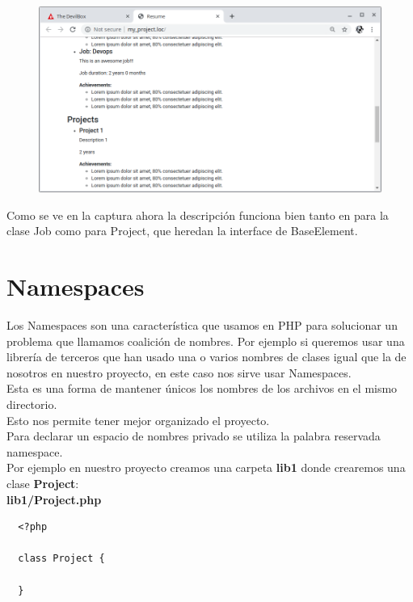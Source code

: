 \documentclass{article}
\begin{document}
\begin{figure}[h!]
  \centering
  \includegraphics[scale=0.5]{./Pictures/049_herencia_interface.png}
\end{figure}

Como se ve en la captura ahora la descripción funciona bien tanto en para la
clase Job como para Project, que heredan la interface de BaseElement.

\newpage

\section{Namespaces}%
Los Namespaces son una característica que usamos en PHP para solucionar un
problema que llamamos coalición de nombres. Por ejemplo si queremos usar una
librería de terceros que han usado una o varios nombres de clases igual que la
de nosotros en nuestro proyecto, en este caso nos sirve usar Namespaces.\\

Esta es una forma de mantener únicos los nombres de los archivos en el mismo
directorio.\\

Esto nos permite tener mejor organizado el proyecto.\\

Para declarar un espacio de nombres privado se utiliza la palabra reservada
namespace.\\

Por ejemplo en nuestro proyecto creamos una carpeta \textbf{lib1} donde
crearemos una clase \textbf{Project}:\\

\textbf{lib1/Project.php}
\begin{verbatim}
  <?php

  class Project {

  }
\end{verbatim}
\end{document}
